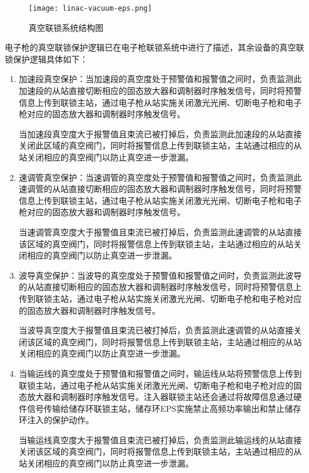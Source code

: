 \begin{figure}[!htb]
	\centering
	\texttt{[image: linac-vacuum-eps.png]}
	\caption{真空联锁系统结构图}
	\label{fig:linac-vacuum-eps}
\end{figure}

电子枪的真空联锁保护逻辑已在电子枪联锁系统中进行了描述，其余设备的真空联锁保护逻辑具体如下：

\begin{enumerate}

  \item 加速段真空保护：当加速段的真空度处于预警值和报警值之间时，负责监测此加速段的从站直接切断相应的固态放大器和调制器时序触发信号，同时将预警信息上传到联锁主站，通过电子枪从站实施关闭激光光闸、切断电子枪和电子枪对应的固态放大器和调制器时序触发信号。

  当加速段真空度大于报警值且束流已被打掉后，负责监测此加速段的从站直接关闭此区域的真空阀门，同时将报警信息上传到联锁主站，主站通过相应的从站关闭相应的真空阀门以防止真空进一步泄漏。

  \item 速调管真空保护：当速调管的真空度处于预警值和报警值之间时，负责监测此速调管的从站直接切断相应的固态放大器和调制器时序触发信号，同时将预警信息上传到联锁主站，通过电子枪从站实施关闭激光光闸、切断电子枪和电子枪对应的固态放大器和调制器时序触发信号。

  当速调管真空度大于报警值且束流已被打掉后，负责监测此速调管的从站直接该区域的真空阀门，同时将报警信息上传到联锁主站，主站通过相应的从站关闭相应的真空阀门以防止真空进一步泄漏。

  \item 波导真空保护：当波导的真空度处于预警值和报警值之间时，负责监测此波导的从站直接切断相应的固态放大器和调制器时序触发信号，同时将预警信息上传到联锁主站，通过电子枪从站实施关闭激光光闸、切断电子枪和电子枪对应的固态放大器和调制器时序触发信号。

  当波导真空度大于报警值且束流已被打掉后，负责监测此速调管的从站直接关闭该区域的真空阀门，同时将报警信息上传到联锁主站，主站通过相应的从站关闭相应的真空阀门以防止真空进一步泄漏。

  \item 当输运线的真空度处于预警值和报警值之间时，输运线从站将预警信息上传到联锁主站，通过电子枪从站实施关闭激光光闸、切断电子枪和电子枪对应的固态放大器和调制器时序触发信号。注入器联锁主站还会通过将故障信息通过硬件信号传输给储存环联锁主站，储存环EPS实施禁止高频功率输出和禁止储存环注入的保护动作。
  
  当输运线真空度大于报警值且束流已被打掉后，负责监测此输运线的从站直接关闭该区域的真空阀门，同时将报警信息上传到联锁主站，主站通过相应的从站关闭相应的真空阀门以防止真空进一步泄漏。

\end{enumerate}

